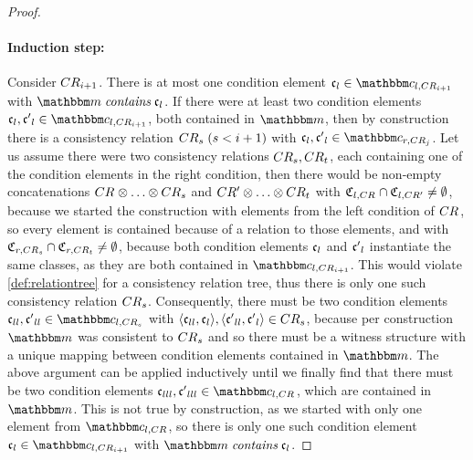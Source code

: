 \begin{proof}
    \paragraph{Induction step:}
    Consider $CR_{i+1}$.
    There is at most one condition element $\conditionelement{c}{l} \in \condition{c}{l, \consistencyrelation{CR}{i+1}}$ with $\modelset{m} \containsmath \conditionelement{c}{l}$.
    If there were at least two condition elements $\conditionelement{c}{l}, \conditionelement{c'}{l} \in \condition{c}{l,\consistencyrelation{CR}{i+1}}$, both contained in $\modelset{m}$, then by construction there is a consistency relation $CR_{s}\; (s < i+1)$ with $\conditionelement{c}{l},\conditionelement{c'}{l} \in \condition{c}{r,\consistencyrelation{CR}{j}}$.
    Let us assume there were two consistency relations $CR_{s}, CR_{t}$, each containing one of the condition elements in the right condition, then there would be non-empty concatenations $\consistencyrelation{CR}{} \concat \dots \concat \consistencyrelation{CR}{s}$ and $\consistencyrelation{CR'}{} \concat \dots \concat \consistencyrelation{CR}{t}$ with $\mathfrak{C}_{l,CR_{}} \cap \mathfrak{C}_{l,CR'_{}} \neq \emptyset$, because we started the construction with elements from the left condition of $CR_{}$, so every element is contained because of a relation to those elements, and with $\mathfrak{C}_{r,CR_{s}} \cap \mathfrak{C}_{r,CR_{t}} \neq \emptyset$, because both condition elements $\mathfrak{c}_{l}$ and $\mathfrak{c'}_{l}$ instantiate the same classes, as they are both contained in $\condition{c}{l,\consistencyrelation{CR}{i+1}}$.
    This would violate \autoref{def:relationtree} for a consistency relation tree, thus there is only one such consistency relation $CR_{s}$.
    Consequently, there must be two condition elements $\conditionelement{c}{ll}, \conditionelement{c'}{ll} \in \condition{c}{l,\consistencyrelation{CR}{s}}$ with $\langle \mathfrak{c}_{ll},\mathfrak{c}_{l} \rangle, \langle \mathfrak{c'}_{ll},\mathfrak{c'}_{l} \rangle \in CR_{s}$, because per construction $\modelset{m}$ was consistent to $CR_{s}$ and so there must be a witness structure with a unique mapping between condition elements contained in $\modelset{m}$.
    The above argument can be applied inductively until we finally find that there must be two condition elements $\conditionelement{c}{lll},\conditionelement{c'}{lll} \in \condition{c}{l,\consistencyrelation{CR}{}}$, which are contained in $\modelset{m}$.
    This is not true by construction, as we started with only one element from $\condition{c}{l,\consistencyrelation{CR}{}}$, so there is only one such condition element $\conditionelement{c}{l} \in \condition{c}{l,\consistencyrelation{CR}{i+1}}$ with $\modelset{m} \containsmath \conditionelement{c}{l}$.
    

\end{proof}
